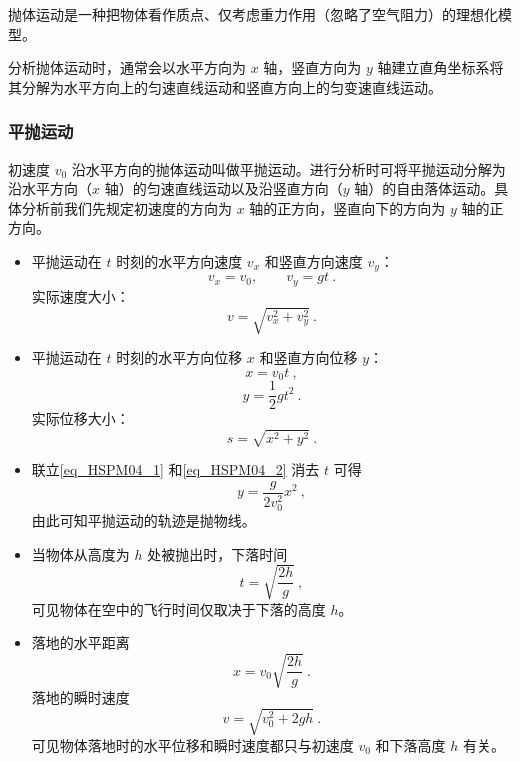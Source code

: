 抛体运动是一种把物体看作质点、仅考虑重力作用（忽略了空气阻力）的理想化模型。

分析抛体运动时，通常会以水平方向为 $x$ 轴，竖直方向为 $y$ 轴建立直角坐标系将其分解为水平方向上的匀速直线运动和竖直方向上的匀变速直线运动。

\subsubsection{平抛运动}
初速度 $v_0$ 沿水平方向的抛体运动叫做平抛运动。进行分析时可将平抛运动分解为沿水平方向（$x$ 轴）的匀速直线运动以及沿竖直方向（$y$ 轴）的自由落体运动。具体分析前我们先规定初速度的方向为 $x$ 轴的正方向，竖直向下的方向为 $y$ 轴的正方向。

\begin{itemize}
\item 平抛运动在 $t$ 时刻的水平方向速度 $v_x$ 和竖直方向速度 $v_y$：
\begin{equation}
v_x=v_0,\qquad 
v_y=gt~.
\end{equation}
实际速度大小：
\begin{equation}
v=\sqrt{v_x^2+v_y^2}~.
\end{equation}

\item 平抛运动在 $t$ 时刻的水平方向位移 $x$ 和竖直方向位移 $y$：
\begin{equation}\label{eq_HSPM04_1}
x=v_0t~,
\end{equation}
\begin{equation}\label{eq_HSPM04_2}
y=\frac12 gt^2~.
\end{equation}
实际位移大小：
\begin{equation}
s=\sqrt{x^2+y^2}~.
\end{equation}

\item 联立\autoref{eq_HSPM04_1} 和\autoref{eq_HSPM04_2} 消去 $t$ 可得
\begin{equation}
y=\frac{g}{2v_0^2}x^2~,
\end{equation}
由此可知平抛运动的轨迹是抛物线。

\item 当物体从高度为 $h$ 处被抛出时，下落时间
\begin{equation}\label{eq_HSPM04_5}
t=\sqrt{\frac{2h}{g}}~,
\end{equation}
可见物体在空中的飞行时间仅取决于下落的高度 $h$。

\item 落地的水平距离
\begin{equation}
x=v_0\sqrt{\frac{2h}{g}}~.
\end{equation}
落地的瞬时速度
\begin{equation}
v=\sqrt{v_0^2+2gh}~.
\end{equation}
可见物体落地时的水平位移和瞬时速度都只与初速度 $v_0$ 和下落高度 $h$ 有关。


\end{itemize}

